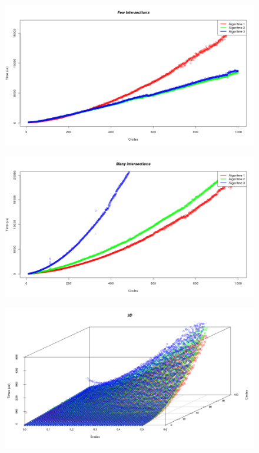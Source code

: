 





\begin{figure}
   \centering
   \includegraphics[width=\textwidth]{illustraties/fewIntersections.png}
\end{figure}
   
\begin{figure}
   \centering
   \includegraphics[width=\textwidth]{illustraties/manyIntersections.png}
\end{figure}

\begin{figure}
   \centering
   \includegraphics[width=\textwidth]{illustraties/3DScatter.png}
\end{figure}


